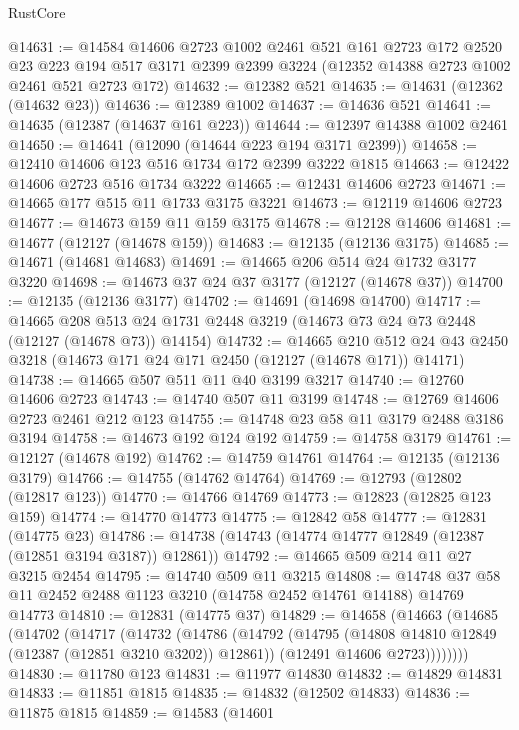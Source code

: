\begin{lexlean}{RustCore}
\begin{coremodule}
@14631 := @14584
    @14606
    @2723
    @1002
    @2461
    @521
    @161
    @2723
    @172
    @2520
    @23
    @223
    @194
    @517
    @3171
    @2399
    @2399
    @3224
    (@12352 @14388 @2723 @1002 @2461 @521 @2723 @172)
@14632 := @12382 @521
@14635 := @14631 (@12362 (@14632 @23))
@14636 := @12389 @1002
@14637 := @14636 @521
@14641 := @14635 (@12387 (@14637 @161 @223))
@14644 := @12397 @14388 @1002 @2461
@14650 := @14641 (@12090 (@14644 @223 @194 @3171 @2399))
@14658 := @12410 @14606 @123 @516 @1734 @172 @2399 @3222 @1815
@14663 := @12422 @14606 @2723 @516 @1734 @3222
@14665 := @12431 @14606 @2723
@14671 := @14665 @177 @515 @11 @1733 @3175 @3221
@14673 := @12119 @14606 @2723
@14677 := @14673 @159 @11 @159 @3175
@14678 := @12128 @14606
@14681 := @14677 (@12127 (@14678 @159))
@14683 := @12135 (@12136 @3175)
@14685 := @14671 (@14681 @14683)
@14691 := @14665 @206 @514 @24 @1732 @3177 @3220
@14698 := @14673 @37 @24 @37 @3177 (@12127 (@14678 @37))
@14700 := @12135 (@12136 @3177)
@14702 := @14691 (@14698 @14700)
@14717 := @14665
    @208
    @513
    @24
    @1731
    @2448
    @3219
    (@14673 @73 @24 @73 @2448 (@12127 (@14678 @73)) @14154)
@14732 := @14665
    @210
    @512
    @24
    @43
    @2450
    @3218
    (@14673 @171 @24 @171 @2450 (@12127 (@14678 @171)) @14171)
@14738 := @14665 @507 @511 @11 @40 @3199 @3217
@14740 := @12760 @14606 @2723
@14743 := @14740 @507 @11 @3199
@14748 := @12769 @14606 @2723 @2461 @212 @123
@14755 := @14748 @23 @58 @11 @3179 @2488 @3186 @3194
@14758 := @14673 @192 @124 @192
@14759 := @14758 @3179
@14761 := @12127 (@14678 @192)
@14762 := @14759 @14761
@14764 := @12135 (@12136 @3179)
@14766 := @14755 (@14762 @14764)
@14769 := @12793 (@12802 (@12817 @123))
@14770 := @14766 @14769
@14773 := @12823 (@12825 @123 @159)
@14774 := @14770 @14773
@14775 := @12842 @58
@14777 := @12831 (@14775 @23)
@14786 := @14738 (@14743 (@14774 @14777 @12849 (@12387 (@12851 @3194 @3187)) @12861))
@14792 := @14665 @509 @214 @11 @27 @3215 @2454
@14795 := @14740 @509 @11 @3215
@14808 := @14748 @37 @58 @11 @2452 @2488 @1123 @3210 (@14758 @2452 @14761 @14188) @14769 @14773
@14810 := @12831 (@14775 @37)
@14829 := @14658
    (@14663
      (@14685
        (@14702
          (@14717
            (@14732
              (@14786
                (@14792
                  (@14795 (@14808 @14810 @12849 (@12387 (@12851 @3210 @3202)) @12861))
                  (@12491 @14606 @2723))))))))
@14830 := @11780 @123
@14831 := @11977 @14830
@14832 := @14829 @14831
@14833 := @11851 @1815
@14835 := @14832 (@12502 @14833)
@14836 := @11875 @1815
@14859 := @14583
    (@14601

\end{coremodule}
\end{lexlean}
